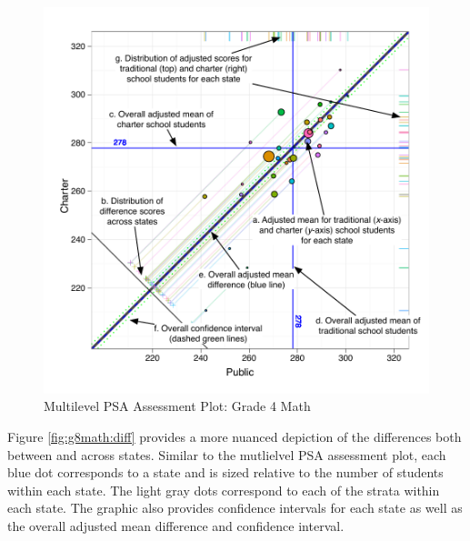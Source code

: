 \documentclass[letterpaper,12p,twoside]{article} %
\begin{document}
\begin{figure}[tp]
\begin{center}
\includegraphics[width=\textwidth]{../Figures/AnnotatedCircPlot.pdf}
\caption{Multilevel PSA Assessment Plot: Grade 4 Math}
\label{fig:g8math:circ}
\end{center}
\end{figure}


Figure \ref{fig:g8math:diff} provides a more nuanced depiction of the differences both between and across states. Similar to the mutlielvel PSA assessment plot, each blue dot corresponds to a state and is sized relative to the number of students within each state. The light gray dots correspond to each of the strata within each state. The graphic also provides confidence intervals for each state as well as the overall adjusted mean difference and confidence interval.
\end{document}

